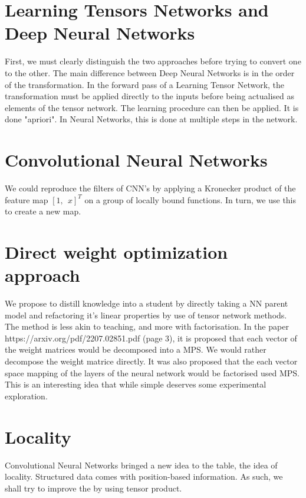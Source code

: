 \documentclass[11pt]{article}
\begin{document}
\section{Learning Tensors Networks and Deep Neural Networks}
First, we must clearly distinguish the two approaches before 
trying to convert one to the other. The main difference between 
Deep Neural Networks is in the order of the transformation. In the 
forward pass of a Learning Tensor Network, the transformation must 
be applied directly to the inputs before being actualised as elements 
of the tensor network. The learning procedure can then be applied. It 
is done "apriori". In Neural Networks, this is done at multiple steps 
in the network. 

\section{Convolutional Neural Networks}
We could reproduce the filters of CNN's by applying a 
Kronecker product of the feature map $[ 1, \ \ x ]^T $ on a 
group of locally bound functions. In turn, we use this to create a new map.

\section{Direct weight optimization approach}
We propose to distill knowledge into a student by directly 
taking a NN parent model and refactoring it's linear properties 
by use of tensor network methods. The method is less akin to teaching, 
and more with factorisation. In the paper 
https://arxiv.org/pdf/2207.02851.pdf (page 3), it is proposed that
 each vector of the weight matrices would be decomposed into a MPS.
  We would rather decompose the weight matrice directly. It was also 
  proposed that the each vector space mapping of the layers of the neural 
  network would be factorised used MPS. This is an interesting idea that 
  while simple deserves some experimental exploration.

\section{Locality}
Convolutional Neural Networks bringed a new idea to the table, the idea of locality. 
Structured data comes with position-based information. 
As such, we shall try to improve the by using tensor product. 
\end{document}
